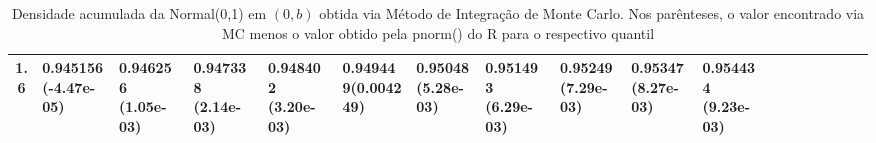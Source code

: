\documentclass[
	article,			%
	12pt,				%
	twoside,			%
	a4paper,			%
	english,			%
	brazil,				%
	]{abntex2}
\begin{document}
\begin{landscape}
\begin{table}
\begin{tabular}{c||p{17mm}|p{17mm}|p{17mm}|p{17mm}|p{17mm}|p{17mm}|p{17mm}|p{17mm}|p{17mm}|p{17mm}|p{17mm}|p{17mm}|p{17mm}|p{17mm}|p{17mm}|p{17mm}|p{17mm}}
    			\hline
    			1.6 & 0.945156 \newline(-4.47e-05)&0.946256 \newline(1.05e-03)&0.947338 \newline(2.14e-03)&0.948402 \newline(3.20e-03)&0.949449\newline(0.004249)&0.95048\newline(5.28e-03)&0.951493 \newline(6.29e-03)&0.95249 \newline(7.29e-03)&0.95347 \newline(8.27e-03)&0.954434 \newline(9.23e-03)\\
    			\hline
    		\end{tabular}
    		\caption{Densidade acumulada da Normal(0,1) em $(0,b)$ obtida via Método de Integração de Monte Carlo. Nos parênteses, o valor encontrado via MC menos o valor obtido pela pnorm() do R para o respectivo quantil}
		\end{table}
		

\end{landscape}
\end{document}

